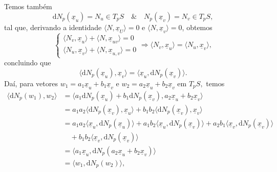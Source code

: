 \documentclass[../differential_geometry.tex]{subfiles}
\begin{document}
Temos também
\[
	\mathrm{d}N_{p}(\underline{x}_{u}) =N_{u}\in T_{p}S \quad\&\quad N_{p}(\underline{x}_{v}) = N_{v}\in T_{p}S,
\]
tal que, derivando a identidade \(\langle N, \underline{x}_{U} \rangle = 0\) e \(\langle N, \underline{x}_{v} \rangle = 0\), obtemos
\[
	\left\{\begin{array}{ll}
		\langle N_{v}, \underline{x}_{u} \rangle + \langle N, \underline{x}_{uv} \rangle = 0 \\
		\langle N_{u}, \underline{x}_{v} \rangle + \langle N, \underline{x}_{u, v} \rangle = 0
	\end{array}\right. \Rightarrow \langle N_{v}, \underline{x}_{u} \rangle = \langle N_{u}, \underline{x}_{v} \rangle,
\]
concluindo que
\[
	\langle \mathrm{d}N_{p}(\underline{x}_{u}) , \underline{x}_{v} \rangle = \langle \underline{x}_{u}, \mathrm{d}N_{p}(\underline{x}_{v}) \rangle.
\]
Daí, para vetores \(w_{1} = a_{1}\underline{x}_{u} + b_{1}\underline{x}_{v}\) e \(w_{2} = a_{2}\underline{x}_{u}+b_{2}\underline{x}_v\) em \(T_{p}S,\) temos
\begin{align*}
	\langle \mathrm{d}N_{p}(w_{1}), w_{2} \rangle & = \langle a_1 \mathrm{d}N_{p}(\underline{x}_{u})+b_1 \mathrm{d}N_{p}(\underline{x}_{v}), a_{2}\underline{x}_{u}+b_{2}\underline{x}_{v} \rangle                                                                                   \\
	                                              & = a_1a_2\langle \mathrm{d}N_{p}(\underline{x}_{v}), \underline{x}_{u} \rangle + b_1b_2\langle \mathrm{d}N_{p}(\underline{x}_{v}), \underline{x}_{v} \rangle                                                                      \\
	                                              & = a_1a_2\langle \underline{x}_{u}, \mathrm{d}N_{p}(\underline{x}_{u}) \rangle + a_1b_2\langle \underline{x}_u, \mathrm{d}N_{p}(\underline{x}_v) \rangle + a_2b_1 \langle \underline{x}_v, \mathrm{d}N_p(\underline{x}_v) \rangle \\
	                                              & \quad + b_1b_2\langle \underline{x}_v, \mathrm{d}N_p(\underline{x}_v) \rangle                                                                                                                                                    \\
	                                              & = \langle a_1\underline{x}_u, \mathrm{d}N_p(a_2\underline{x}_u + b_2\underline{x}_v) \rangle                                                                                                                                     \\
	                                              & = \langle w_1, \mathrm{d}N_p(w_2) \rangle,
\end{align*}
\end{document}
